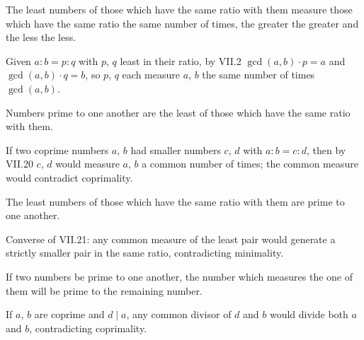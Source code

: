 \begin{claim}
\label{prop:VII.20}
The least numbers of those which have the same ratio with them
measure those which have the same ratio the same number of times,
the greater the greater and the less the less.
\end{claim}
\begin{evidence}
\label{ev:VII.20}
Given $a : b = p : q$ with $p$, $q$ least in their ratio, by VII.2
$\gcd(a, b) \cdot p = a$ and $\gcd(a, b) \cdot q = b$, so $p$, $q$
each measure $a$, $b$ the same number of times $\gcd(a, b)$.
\end{evidence}

\begin{claim}
\label{prop:VII.21}
Numbers prime to one another are the least of those which have the
same ratio with them.
\end{claim}
\begin{evidence}
\label{ev:VII.21}
If two coprime numbers $a$, $b$ had smaller numbers $c$, $d$ with
$a : b = c : d$, then by VII.20 $c$, $d$ would measure $a$, $b$ a
common number of times; the common measure would contradict
coprimality.
\end{evidence}

\begin{claim}
\label{prop:VII.22}
The least numbers of those which have the same ratio with them are
prime to one another.
\end{claim}
\begin{evidence}
\label{ev:VII.22}
Converse of VII.21: any common measure of the least pair would
generate a strictly smaller pair in the same ratio, contradicting
minimality.
\end{evidence}

\begin{claim}
\label{prop:VII.23}
If two numbers be prime to one another, the number which measures
the one of them will be prime to the remaining number.
\end{claim}
\begin{evidence}
\label{ev:VII.23}
If $a$, $b$ are coprime and $d \mid a$, any common divisor of $d$ and
$b$ would divide both $a$ and $b$, contradicting coprimality.
\end{evidence}

